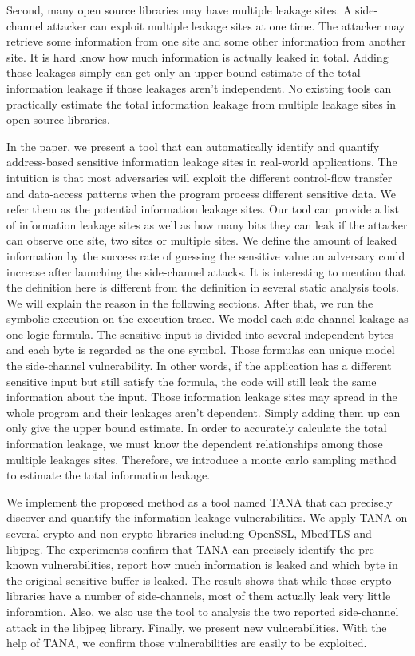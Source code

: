 Second, many open source libraries may have multiple leakage sites. 
A side-channel attacker\cite{191010,7163052} can exploit multiple leakage sites at one time. 
The attacker may retrieve some information from one site and some other information 
from another site.
It is hard know how much information is actually leaked in total. Adding those leakages 
simply can get only an upper bound estimate of the total information leakage if those 
leakages aren’t independent. No existing tools can practically estimate the total information 
leakage from multiple leakage sites in open source libraries.

In the paper, we present a tool that can automatically identify and quantify address-based
sensitive information leakage sites in real-world applications. The intuition is that most
adversaries will exploit the different control-flow transfer and data-access patterns when 
the program process different sensitive data. We refer them as the potential information
leakage sites. Our tool can provide a list of information leakage sites as well as how many 
bits they can leak if the attacker can observe one site, two sites or multiple sites. 
We define the amount of leaked information by the success rate of guessing the sensitive value 
an adversary could increase after launching the side-channel attacks. It is interesting to 
mention that the definition here is different from the definition in several static analysis 
tools. We will explain the reason in the following sections. After that, we run the symbolic 
execution on the execution trace. We model each side-channel leakage as one logic formula. 
The sensitive input is divided into several independent bytes and each byte is regarded as 
the one symbol. Those formulas can unique model the side-channel vulnerability. 
In other words, if the application has a different sensitive input but still satisfy the formula, 
the code will still leak the same information about the input.  
Those information leakage sites may spread in the whole program 
and their leakages aren’t dependent. Simply adding them up can only give the upper bound 
estimate. In order to accurately calculate the total information leakage, we must know the 
dependent relationships among those multiple leakages sites. Therefore, we introduce a 
monte carlo sampling method to estimate the total information leakage.

We implement the proposed method as a tool named TANA that can precisely discover and quantify the information
leakage vulnerabilities. We apply TANA on several crypto and non-crypto libraries including OpenSSL,
MbedTLS and libjpeg. The experiments confirm that TANA can precisely identify the pre-known vulnerabilities,
report how much information is leaked and which byte in the original sensitive buffer is leaked. 
The result shows that while those crypto libraries have a number of side-channels, most of them actually
leak very little inforamtion. Also, we also use the tool to analysis the two reported side-channel attack 
in the libjpeg library. Finally, we present new vulnerabilities. With the help of TANA, we confirm those
vulnerabilities are easily to be exploited.

